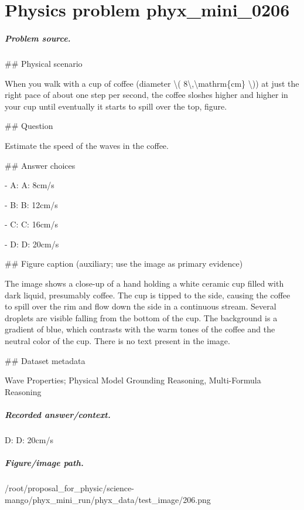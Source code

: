 
\chapter{Physics problem phyx\_mini\_0206}
\label{ch:PhyXMiniProblems_problem_phyx_mini_0206}

\paragraph{Problem source.}
\#\# Physical scenario

When you walk with a cup of coffee (diameter \textbackslash{}( 8\textbackslash{},\textbackslash{}mathrm\{cm\} \textbackslash{})) at just the right pace of about one step per second, the coffee sloshes higher and higher in your cup until eventually it starts to spill over the top, figure.

\#\# Question

Estimate the speed of the waves in the coffee.

\#\# Answer choices

- A: A: 8cm/s

- B: B: 12cm/s

- C: C: 16cm/s

- D: D: 20cm/s

\#\# Figure caption (auxiliary; use the image as primary evidence)

The image shows a close-up of a hand holding a white ceramic cup filled with dark liquid, presumably coffee. The cup is tipped to the side, causing the coffee to spill over the rim and flow down the side in a continuous stream. Several droplets are visible falling from the bottom of the cup. The background is a gradient of blue, which contrasts with the warm tones of the coffee and the neutral color of the cup. There is no text present in the image.

\#\# Dataset metadata

Wave Properties; Physical Model Grounding Reasoning, Multi-Formula Reasoning

\paragraph{Recorded answer/context.}
D: D: 20cm/s

\paragraph{Figure/image path.}
/root/proposal\_for\_physic/science-mango/phyx\_mini\_run/phyx\_data/test\_image/206.png

